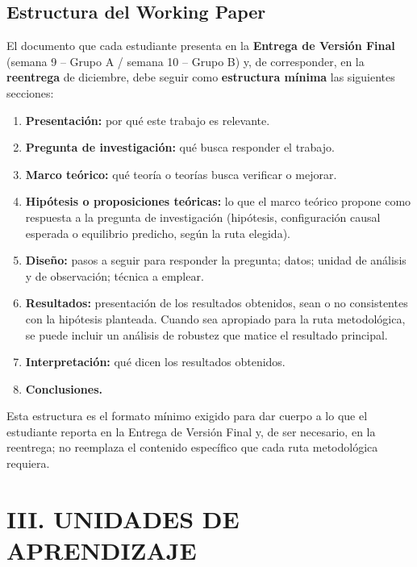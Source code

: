 \documentclass[11pt,a4paper]{article}
\begin{document}
\subsection{Estructura del Working Paper}
El documento que cada estudiante presenta en la \textbf{Entrega de Versión Final} (semana 9 -- Grupo A / semana 10 -- Grupo B) y, de corresponder, en la \textbf{reentrega} de diciembre, debe seguir como \textbf{estructura mínima} las siguientes secciones:

\begin{enumerate}
    \item \textbf{Presentación:} por qué este trabajo es relevante.
    \item \textbf{Pregunta de investigación:} qué busca responder el trabajo.
    \item \textbf{Marco teórico:} qué teoría o teorías busca verificar o mejorar.
    \item \textbf{Hipótesis o proposiciones teóricas:} lo que el marco teórico propone como respuesta a la pregunta de investigación (hipótesis, configuración causal esperada o equilibrio predicho, según la ruta elegida).
    \item \textbf{Diseño:} pasos a seguir para responder la pregunta; datos; unidad de análisis y de observación; técnica a emplear.
    \item \textbf{Resultados:} presentación de los resultados obtenidos, sean o no consistentes con la hipótesis planteada. Cuando sea apropiado para la ruta metodológica, se puede incluir un análisis de robustez que matice el resultado principal.
    \item \textbf{Interpretación:} qué dicen los resultados obtenidos.
    \item \textbf{Conclusiones.}
\end{enumerate}
Esta estructura es el formato mínimo exigido para dar cuerpo a lo que el estudiante reporta en la Entrega de Versión Final y, de ser necesario, en la reentrega; no reemplaza el contenido específico que cada ruta metodológica requiera.

\section{III. UNIDADES DE APRENDIZAJE}
\end{document}
